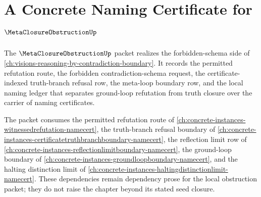 \chapter{A Concrete Naming Certificate for $\MetaClosureObstructionUp$}
\label{ch:concrete-instances-metaclosureobstruction-namecert}

The $\MetaClosureObstructionUp$ packet realizes the forbidden-schema side of \autoref{ch:visions-reasoning-by-contradiction-boundary}. It records the permitted refutation route, the forbidden contradiction-schema request, the certificate-indexed truth-branch refusal row, the meta-loop boundary row, and the local naming ledger that separates ground-loop refutation from truth closure over the carrier of naming certificates.

The packet consumes the permitted refutation route of \autoref{ch:concrete-instances-witnessedrefutation-namecert}, the truth-branch refusal boundary of \autoref{ch:concrete-instances-certificatetruthbranchboundary-namecert}, the reflection limit row of \autoref{ch:concrete-instances-reflectionlimitboundary-namecert}, the ground-loop boundary of \autoref{ch:concrete-instances-groundloopboundary-namecert}, and the halting distinction limit of \autoref{ch:concrete-instances-haltingdistinctionlimit-namecert}. These dependencies remain dependency prose for the local obstruction packet; they do not raise the chapter beyond its stated seed closure.

